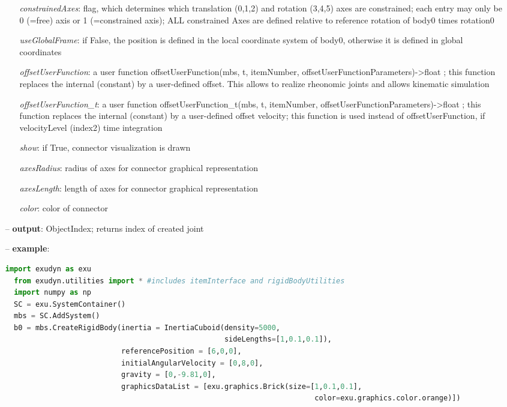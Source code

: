 \begin{itemize}[leftmargin=0.7cm]
\begin{itemize}[leftmargin=1.2cm]
\item[]{\it constrainedAxes}: flag, which determines which translation (0,1,2) and rotation (3,4,5) axes are constrained; each entry may only be 0 (=free) axis or 1 (=constrained axis); ALL constrained Axes are defined relative to reference rotation of body0 times rotation0
\item[]{\it useGlobalFrame}: if False, the position is defined in the local coordinate system of body0, otherwise it is defined in global coordinates
\item[]{\it offsetUserFunction}: a user function offsetUserFunction(mbs, t, itemNumber, offsetUserFunctionParameters)->float ; this function replaces the internal (constant) by a user-defined offset. This allows to realize rheonomic joints and allows kinematic simulation
\item[]{\it offsetUserFunction\_t}: a user function offsetUserFunction\_t(mbs, t, itemNumber, offsetUserFunctionParameters)->float ; this function replaces the internal (constant) by a user-defined offset velocity; this function is used instead of offsetUserFunction, if velocityLevel (index2) time integration
\item[]{\it show}: if True, connector visualization is drawn
\item[]{\it axesRadius}: radius of axes for connector graphical representation
\item[]{\it axesLength}: length of axes for connector graphical representation
\item[]{\it color}: color of connector
\end{itemize}
\item[--]
{\bf output}: ObjectIndex; returns index of created joint
\item[--]
{\bf example}: \vspace{-12pt}\ei\begin{lstlisting}[language=Python, xleftmargin=36pt]
  import exudyn as exu
  from exudyn.utilities import * #includes itemInterface and rigidBodyUtilities
  import numpy as np
  SC = exu.SystemContainer()
  mbs = SC.AddSystem()
  b0 = mbs.CreateRigidBody(inertia = InertiaCuboid(density=5000,
                                                   sideLengths=[1,0.1,0.1]),
                           referencePosition = [6,0,0],
                           initialAngularVelocity = [0,8,0],
                           gravity = [0,-9.81,0],
                           graphicsDataList = [exu.graphics.Brick(size=[1,0.1,0.1],
                                                                        color=exu.graphics.color.orange)])

\end{lstlisting}
\end{itemize}
